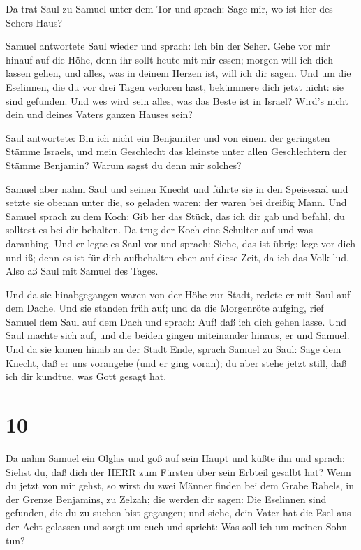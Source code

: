  Da trat Saul zu Samuel unter dem Tor und sprach: Sage mir,
wo ist hier des Sehers Haus?

 Samuel antwortete Saul wieder und sprach: Ich bin der
Seher. Gehe vor mir hinauf auf die Höhe, denn ihr sollt heute mit mir
essen; morgen will ich dich lassen gehen, und alles, was in deinem
Herzen ist, will ich dir sagen.  Und um die Eselinnen, die
du vor drei Tagen verloren hast, bekümmere dich jetzt nicht: sie sind
gefunden. Und wes wird sein alles, was das Beste ist in Israel? Wird's
nicht dein und deines Vaters ganzen Hauses sein?

 Saul antwortete: Bin ich nicht ein Benjamiter und von
einem der geringsten Stämme Israels, und mein Geschlecht das kleinste
unter allen Geschlechtern der Stämme Benjamin? Warum sagst du denn mir
solches?

 Samuel aber nahm Saul und seinen Knecht und führte sie in
den Speisesaal und setzte sie obenan unter die, so geladen waren; der
waren bei dreißig Mann.  Und Samuel sprach zu dem Koch: Gib
her das Stück, das ich dir gab und befahl, du solltest es bei dir
behalten.  Da trug der Koch eine Schulter auf und was
daranhing. Und er legte es Saul vor und sprach: Siehe, das ist übrig;
lege vor dich und iß; denn es ist für dich aufbehalten eben auf diese
Zeit, da ich das Volk lud. Also aß Saul mit Samuel des Tages.

 Und da sie hinabgegangen waren von der Höhe zur Stadt,
redete er mit Saul auf dem Dache.  Und sie standen früh
auf; und da die Morgenröte aufging, rief Samuel dem Saul auf dem Dach
und sprach: Auf! daß ich dich gehen lasse. Und Saul machte sich auf, und
die beiden gingen miteinander hinaus, er und Samuel.  Und
da sie kamen hinab an der Stadt Ende, sprach Samuel zu Saul: Sage dem
Knecht, daß er uns vorangehe (und er ging voran); du aber stehe jetzt
still, daß ich dir kundtue, was Gott gesagt hat.

\hypertarget{section-9}{%
\section{10}\label{section-9}}

 Da nahm Samuel ein Ölglas und goß auf sein Haupt und küßte
ihn und sprach: Siehst du, daß dich der HERR zum Fürsten über sein
Erbteil gesalbt hat?  Wenn du jetzt von mir gehst, so wirst
du zwei Männer finden bei dem Grabe Rahels, in der Grenze Benjamins, zu
Zelzah; die werden dir sagen: Die Eselinnen sind gefunden, die du zu
suchen bist gegangen; und siehe, dein Vater hat die Esel aus der Acht
gelassen und sorgt um euch und spricht: Was soll ich um meinen Sohn tun?

